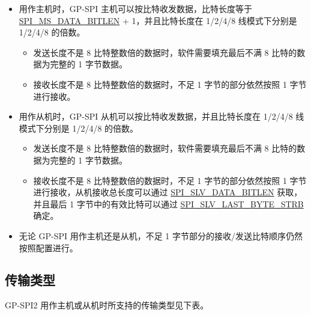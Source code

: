 \documentclass[main\_\_CN.tex]{subfiles}
\begin{document}
\begin{itemize}
    \item 用作主机时，GP-SPI 主机可以按比特收发数据，比特长度等于   \hyperref[fielddesc:SPIMSDATABITLEN]{SPI\_MS\_DATA\_BITLEN} + 1，并且比特长度在 1/2/4/8 线模式下分别是 1/2/4/8 的倍数。%
    \begin{itemize}
        \item 发送长度不是 8 比特整数倍的数据时，软件需要填充最后不满 8 比特的数据为完整的 1 字节数据。
        \item 接收长度不是 8 比特整数倍的数据时，不足 1 字节的部分依然按照 1 字节进行接收。
    \end{itemize}
    \item 用作从机时，GP-SPI 从机可以按比特收发数据，并且比特长度在 1/2/4/8 线模式下分别是 1/2/4/8 的倍数。
    \begin{itemize}
        \item 发送长度不是 8 比特整数倍的数据时，软件需要填充最后不满 8 比特的数据为完整的 1 字节数据。
        \item 接收长度不是 8 比特整数倍的数据时，不足 1 字节的部分依然按照 1 字节进行接收，从机接收总长度可以通过  \hyperref[fielddesc:SPISLVDATABITLEN]{SPI\_SLV\_DATA\_BITLEN} 获取，并且最后 1 字节中的有效比特可以通过 \hyperref[fielddesc:SPISLVLASTBYTESTRB]{SPI\_SLV\_LAST\_BYTE\_STRB} 确定。
    \end{itemize}
\end{itemize}
\begin{tiplisting}
\vspace{-2em}
\begin{itemize}
    \item 无论 GP-SPI 用作主机还是从机，不足 1 字节部分的接收/发送比特顺序仍然按照配置进行。
\end{itemize}
\end{tiplisting}


\subsection{传输类型}

GP-SPI2 用作主机或从机时所支持的传输类型见下表。
\end{document}
